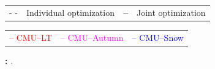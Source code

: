 \begin{figure}
\begin{minipage}{0.65\linewidth}
		\vspace{0.2cm}
		
		\begin{footnotesize}
			\setlength{\tabcolsep}{2pt}
			\begin{tabular}{c l c l}
				\Large{- -} & Individual optimization & \textbf{\Large{--}} & Joint optimization \\
			\end{tabular}			
			
			\begin{tabular}{c c c}
				\textcolor{red}{{--} CMU--LT} & \textcolor{magenta}{{--} CMU--Autumn} & \textcolor{blue}{{--} CMU--Snow} \\
			\end{tabular}			
		\end{footnotesize}
		
	\end{minipage}\hfill
	\begin{minipage}{0.35\linewidth}
		\caption[Descriptors fusion]{\label{fig:fuse_desc} \textbf{:} .}
	\end{minipage}	

\end{figure}
	